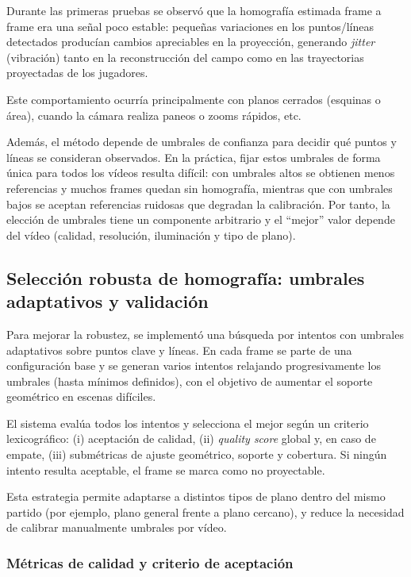 Durante las primeras pruebas se observó que la homografía estimada frame a frame era una señal poco estable: pequeñas variaciones en los puntos/líneas detectados producían cambios apreciables en la proyección, generando \textit{jitter} (vibración) tanto en la reconstrucción del campo como en las trayectorias proyectadas de los jugadores.

Este comportamiento ocurría principalmente con planos cerrados (esquinas o área), cuando la cámara realiza paneos o zooms rápidos, etc. 

Además, el método depende de umbrales de confianza para decidir qué puntos y líneas se consideran observados. En la práctica, fijar estos umbrales de forma única para todos los vídeos resulta difícil: con umbrales altos se obtienen menos referencias y muchos frames quedan sin homografía, mientras que con umbrales bajos se aceptan referencias ruidosas que degradan la calibración. Por tanto, la elección de umbrales tiene un componente arbitrario y el ``mejor'' valor depende del vídeo (calidad, resolución, iluminación y tipo de plano).

\subsection{Selección robusta de homografía: umbrales adaptativos y validación}

Para mejorar la robustez, se implementó una búsqueda por intentos con umbrales adaptativos sobre puntos clave y líneas. En cada frame se parte de una configuración base y se generan varios intentos relajando progresivamente los umbrales (hasta mínimos definidos), con el objetivo de aumentar el soporte geométrico en escenas difíciles.

El sistema evalúa todos los intentos y selecciona el mejor según un criterio lexicográfico: (i) aceptación de calidad, (ii) \textit{quality score} global y, en caso de empate, (iii) submétricas de ajuste geométrico, soporte y cobertura. Si ningún intento resulta aceptable, el frame se marca como no proyectable.

Esta estrategia permite adaptarse a distintos tipos de plano dentro del mismo partido (por ejemplo, plano general frente a plano cercano), y reduce la necesidad de calibrar manualmente umbrales por vídeo.

\subsubsection{Métricas de calidad y criterio de aceptación}


